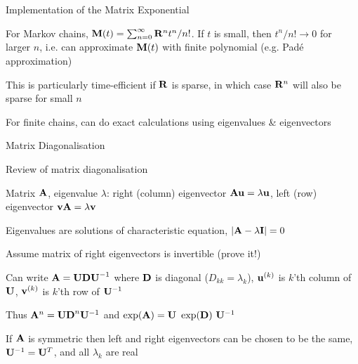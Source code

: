 \documentclass{beamer}
\begin{document}
\begin{frame}{Implementation of the Matrix Exponential}

\itemb
 \item For Markov chains, ${\bf M}(t) = \sum_{n=0}^\infty {\bf R}^n t^n / n!$. If $t$ is small, then $t^n/n! \to 0$ for larger $n$,
i.e. can approximate ${\bf M}(t)$ with finite polynomial (e.g. Pad\'{e} approximation)
\pause
 \item This is particularly time-efficient if ${\bf R}$ is sparse, in which case ${\bf R}^n$ will also be sparse for small $n$
\pause
 \item For finite chains, can do exact calculations using eigenvalues \& eigenvectors
\iteme

\end{frame}

\begin{frame}{Matrix Diagonalisation}

\itemb
\item Review of matrix diagonalisation
 \itemb
 \item Matrix ${\bf A}$, eigenvalue $\lambda$: right (column) eigenvector ${\bf Au} = \lambda{\bf u}$, left (row) eigenvector ${\bf v}{\bf A} = \lambda{\bf v}$
%
 \item Eigenvalues are solutions of \alert{characteristic equation}, $|{\bf A} - \lambda {\bf I}| = 0$
%
 \item Assume matrix of right eigenvectors is invertible (\alert{prove it!})
\pause
 \item Can write ${\bf A} = {\bf UDU}^{-1}$ where ${\bf D}$ is diagonal ($D_{kk} = \lambda_k$), ${\bf u}^{(k)}$ is $k$'th column of ${\bf U}$, ${\bf v}^{(k)}$ is $k$'th row of ${\bf U}^{-1}$
\pause
 \item Thus ${\bf A}^n = {\bf UD}^n{\bf U}^{-1}$ and $\exp({\bf A}) = {\bf U}\ \exp({\bf D})\ {\bf U}^{-1}$
\pause
 \item If ${\bf A}$ is symmetric then left and right eigenvectors can be chosen to be the same, ${\bf U}^{-1} = {\bf U}^T$, and all $\lambda_k$ are real
 \iteme
\iteme

\end{frame}
\end{document}
